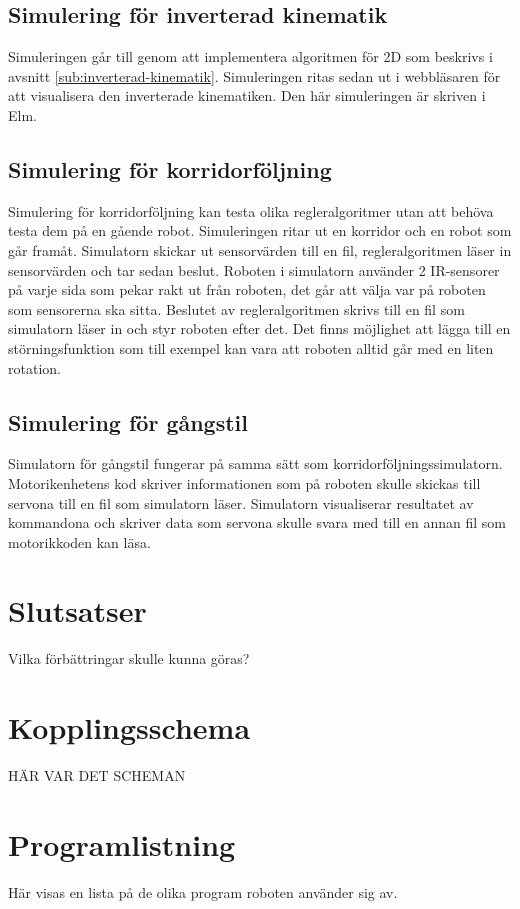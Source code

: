 \documentclass[a4paper,titlepage,12pt]{article}
\begin{document}
	\subsection{Simulering för inverterad kinematik}
	Simuleringen går till genom att implementera algoritmen för 2D som beskrivs
    i avsnitt \ref{sub:inverterad-kinematik}. Simuleringen ritas sedan ut i
    webbläsaren för att visualisera den inverterade kinematiken. Den här
    simuleringen är skriven i Elm.
	
	\subsection{Simulering för korridorföljning}
	Simulering för korridorföljning kan testa olika regleralgoritmer utan att
    behöva testa dem på en gående robot. Simuleringen ritar ut en korridor och
    en robot som går framåt. Simulatorn skickar ut sensorvärden till en fil,
    regleralgoritmen läser in sensorvärden och tar sedan beslut. Roboten i
    simulatorn använder 2 IR-sensorer på varje sida som pekar rakt ut från
    roboten, det går att välja var på roboten som sensorerna ska sitta. Beslutet
    av regleralgoritmen skrivs till en fil som simulatorn läser in och styr
    roboten efter det. Det finns möjlighet att lägga till en störningsfunktion
    som till exempel kan vara att roboten alltid går med en liten rotation.
	
	\subsection{Simulering för gångstil}
	Simulatorn för gångstil fungerar på samma sätt som
    korridorföljningssimulatorn. Motorikenhetens kod skriver informationen som
    på roboten skulle skickas till servona till en fil som simulatorn läser.
    Simulatorn visualiserar resultatet av kommandona och skriver data som
    servona skulle svara med till en annan fil som motorikkoden kan läsa.

	\section{Slutsatser}
	Vilka förbättringar skulle kunna göras?

	\appendix
	\section{Kopplingsschema}
	HÄR VAR DET SCHEMAN
	
	\section{Programlistning}
	Här visas en lista på de olika program roboten
	använder sig av.
	
\end{document}
